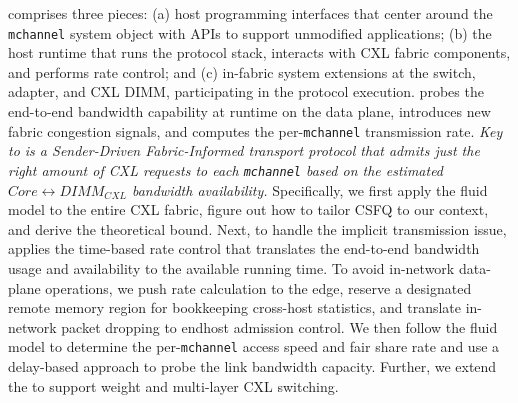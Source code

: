 \sys comprises three pieces: (a) host programming interfaces that center around the \texttt{mchannel} system object with APIs to support unmodified applications; (b) the host runtime that runs the protocol stack, interacts with CXL fabric components, and performs rate control; and (c) in-fabric system extensions at the switch, adapter, and CXL DIMM, participating in the protocol execution. \sys probes the end-to-end bandwidth capability at runtime on the data plane, introduces new fabric congestion signals, and computes the per-\texttt{mchannel} transmission rate. {\it Key to \sys is a Sender-Driven Fabric-Informed transport protocol that admits just the right amount of CXL requests to each \texttt{mchannel} based on the estimated $Core \leftrightarrow DIMM_{CXL}$ bandwidth availability.} Specifically, we first apply the fluid model to the entire CXL fabric, figure out how to tailor CSFQ to our context, and derive the theoretical bound. Next, to handle the implicit transmission issue, \sys applies the time-based rate control that translates the end-to-end bandwidth usage and availability to the available running time. To avoid in-network data-plane operations, we push rate calculation to the edge, reserve a designated remote memory region for bookkeeping cross-host statistics, and translate in-network packet dropping to endhost admission control. We then follow the fluid model to determine the per-\texttt{mchannel} access speed and fair share rate and use a delay-based approach to probe the link bandwidth capacity. Further, we extend the \sys to support weight and multi-layer CXL switching.




